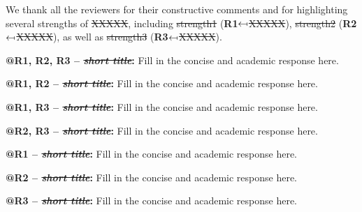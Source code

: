 
We thank all the reviewers for their constructive comments and for highlighting several strengths of \sout{XXXXX},
including \sout{strength1} (\textbf{\textcolor{r1}{R1}}$\reflectbox{$\mapsto$}$\sout{XXXXX}),
\sout{strength2} (\textbf{\textcolor{r2}{R2}}$\reflectbox{$\mapsto$}$\sout{XXXXX}),
as well as \sout{strength3} (\textbf{\textcolor{r3}{R3}}$\reflectbox{$\mapsto$}$\sout{XXXXX}).

\setlength{\parindent}{0pt}
\setlength{\parskip}{0.4pt}
\textbf{@\textcolor{r1}{R1}, \textcolor{r2}{R2}, \textcolor{r3}{R3} -- \textit{\sout{short title}}:}
Fill in the concise and academic response here.
\setlength{\parindent}{1pc}
\setlength{\parskip}{0pt}

\setlength{\parindent}{0pt}
\setlength{\parskip}{0.4pt}
\textbf{@\textcolor{r1}{R1}, \textcolor{r2}{R2} -- \textit{\sout{short title}}:}
Fill in the concise and academic response here.
\setlength{\parindent}{1pc}
\setlength{\parskip}{0pt}

\setlength{\parindent}{0pt}
\setlength{\parskip}{0.4pt}
\textbf{@\textcolor{r1}{R1}, \textcolor{r3}{R3} -- \textit{\sout{short title}}:}
Fill in the concise and academic response here.
\setlength{\parindent}{1pc}
\setlength{\parskip}{0pt}

\setlength{\parindent}{0pt}
\setlength{\parskip}{0.4pt}
\textbf{@\textcolor{r2}{R2}, \textcolor{r3}{R3} -- \textit{\sout{short title}}:}
Fill in the concise and academic response here.
\setlength{\parindent}{1pc}
\setlength{\parskip}{0pt}

\setlength{\parindent}{0pt}
\setlength{\parskip}{0.4pt}
\textbf{@\textcolor{r1}{R1} -- \textit{\sout{short title}}:}
Fill in the concise and academic response here.
\setlength{\parindent}{1pc}
\setlength{\parskip}{0pt}

\setlength{\parindent}{0pt}
\setlength{\parskip}{0.4pt}
\textbf{@\textcolor{r2}{R2} -- \textit{\sout{short title}}:}
Fill in the concise and academic response here.
\setlength{\parindent}{1pc}
\setlength{\parskip}{0pt}

\setlength{\parindent}{0pt}
\setlength{\parskip}{0.4pt}
\textbf{@\textcolor{r3}{R3} -- \textit{\sout{short title}}:}
Fill in the concise and academic response here.
\setlength{\parindent}{1pc}
\setlength{\parskip}{0pt}